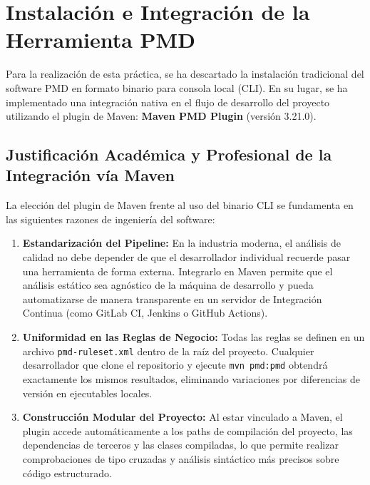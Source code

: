 \documentclass[12pt,a4paper]{article}
\begin{document}
\newpage

\section{Instalación e Integración de la Herramienta PMD}
Para la realización de esta práctica, se ha descartado la instalación tradicional del software PMD en formato binario para consola local (CLI). En su lugar, se ha implementado una integración nativa en el flujo de desarrollo del proyecto utilizando el plugin de Maven: \textbf{Maven PMD Plugin} (versión 3.21.0).

\subsection{Justificación Académica y Profesional de la Integración vía Maven}
La elección del plugin de Maven frente al uso del binario CLI se fundamenta en las siguientes razones de ingeniería del software:
\begin{enumerate}
    \item \textbf{Estandarización del Pipeline:} En la industria moderna, el análisis de calidad no debe depender de que el desarrollador individual recuerde pasar una herramienta de forma externa. Integrarlo en Maven permite que el análisis estático sea agnóstico de la máquina de desarrollo y pueda automatizarse de manera transparente en un servidor de Integración Continua (como GitLab CI, Jenkins o GitHub Actions).
    \item \textbf{Uniformidad en las Reglas de Negocio:} Todas las reglas se definen en un archivo \texttt{pmd-ruleset.xml} dentro de la raíz del proyecto. Cualquier desarrollador que clone el repositorio y ejecute \texttt{mvn pmd:pmd} obtendrá exactamente los mismos resultados, eliminando variaciones por diferencias de versión en ejecutables locales.
    \item \textbf{Construcción Modular del Proyecto:} Al estar vinculado a Maven, el plugin accede automáticamente a los paths de compilación del proyecto, las dependencias de terceros y las clases compiladas, lo que permite realizar comprobaciones de tipo cruzadas y análisis sintáctico más precisos sobre código estructurado.
\end{enumerate}
\end{document}
